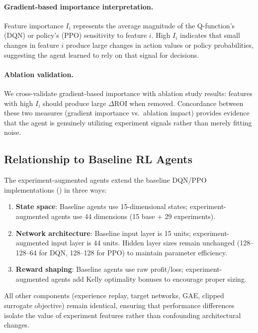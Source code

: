 \paragraph{Gradient-based importance interpretation.}
Feature importance $I_i$ represents the average magnitude of the Q-function's (DQN) or policy's (PPO) sensitivity to feature $i$. High $I_i$ indicates that small changes in feature $i$ produce large changes in action values or policy probabilities, suggesting the agent learned to rely on that signal for decisions.

\paragraph{Ablation validation.}
We cross-validate gradient-based importance with ablation study results: features with high $I_i$ should produce large $\Delta \text{ROI}$ when removed. Concordance between these two measures (gradient importance vs.\ ablation impact) provides evidence that the agent is genuinely utilizing experiment signals rather than merely fitting noise.

\subsection{Relationship to Baseline RL Agents}

The experiment-augmented agents extend the baseline DQN/PPO implementations () in three ways:

\begin{enumerate}
  \item \textbf{State space}: Baseline agents use 15-dimensional states; experiment-augmented agents use 44 dimensions (15 base + 29 experiments).
  \item \textbf{Network architecture}: Baseline input layer is 15 units; experiment-augmented input layer is 44 units. Hidden layer sizes remain unchanged (128--128--64 for DQN, 128--128 for PPO) to maintain parameter efficiency.
  \item \textbf{Reward shaping}: Baseline agents use raw profit/loss; experiment-augmented agents add Kelly optimality bonuses to encourage proper sizing.
\end{enumerate}

All other components (experience replay, target networks, GAE, clipped surrogate objective) remain identical, ensuring that performance differences isolate the value of experiment features rather than confounding architectural changes.

